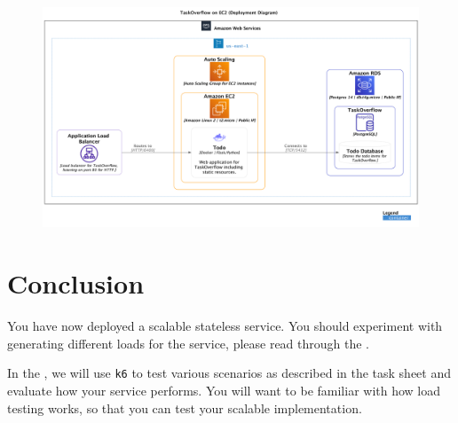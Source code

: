 \documentclass{csse4400}
\begin{document}

\begin{figure}[H]
  \includegraphics[trim=0 230 0 0,clip,width=\textwidth]{diagrams/ec2deployment}
\end{figure}


\section{Conclusion}
You have now deployed a scalable stateless service.
You should experiment with generating different loads for the service,
please read through the .

In the ,
we will use \texttt{k6} to test various scenarios as described in the task sheet and evaluate how your service performs.
You will want to be familiar with how load testing works,
so that you can test your scalable implementation.




\end{document}

